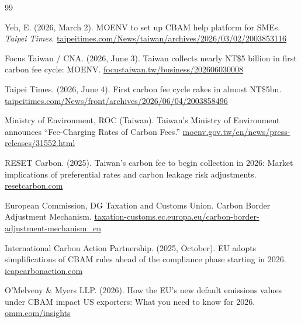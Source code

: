 \clearpage
{}
{}
\footnotesize
\begin{thebibliography}{99}\setlength{\itemsep}{2pt}

 Yeh, E. (2026, March 2). MOENV to set up CBAM help platform
for SMEs. \emph{Taipei Times}.
\href{https://www.taipeitimes.com/News/taiwan/archives/2026/03/02/2003853116}{taipeitimes.com/News/taiwan/archives/2026/03/02/2003853116}

 Focus Taiwan / CNA. (2026, June 3). Taiwan collects nearly
NT\$5 billion in first carbon fee cycle: MOENV.
\href{https://focustaiwan.tw/business/202606030008}{focustaiwan.tw/business/202606030008}

 Taipei Times. (2026, June 4). First carbon fee cycle rakes in
almost NT\$5bn.
\href{https://www.taipeitimes.com/News/front/archives/2026/06/04/2003858496}{taipeitimes.com/News/front/archives/2026/06/04/2003858496}

 Ministry of Environment, ROC (Taiwan). Taiwan's Ministry of
Environment announces ``Fee-Charging Rates of Carbon Fees.''
\href{https://www.moenv.gov.tw/en/news/press-releases/31552.html}{moenv.gov.tw/en/news/press-releases/31552.html}

 RESET Carbon. (2025). Taiwan's carbon fee to begin collection
in 2026: Market implications of preferential rates and carbon leakage risk
adjustments.
\href{https://resetcarbon.com/en/taiwans-carbon-fee-to-begin-collection-in-2026-market-implications-of-preferential-rates-and-carbon-leakage-risk-adjustments/}{resetcarbon.com}

 European Commission, DG Taxation and Customs Union. Carbon
Border Adjustment Mechanism.
\href{https://taxation-customs.ec.europa.eu/carbon-border-adjustment-mechanism_en}{taxation-customs.ec.europa.eu/carbon-border-adjustment-mechanism\_en}

 International Carbon Action Partnership. (2025, October). EU
adopts simplifications of CBAM rules ahead of the compliance phase starting in
2026.
\href{https://icapcarbonaction.com/en/news/eu-adopts-simplifications-cbam-rules-ahead-compliance-phase-starting-2026}{icapcarbonaction.com}

 O'Melveny \& Myers LLP. (2026). How the EU's new default
emissions values under CBAM impact US exporters: What you need to know for
2026.
\href{https://www.omm.com/insights/alerts-publications/how-the-eu-s-new-default-emissions-values-under-cbam-impact-us-exporters-what-you-need-to-know-for-2026/}{omm.com/insights}


\end{thebibliography}
